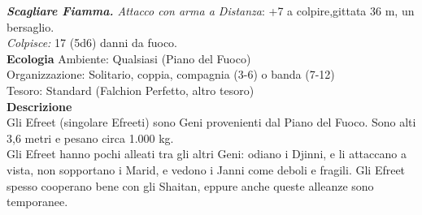\begin{multicols}{2}
\emph{\textbf{Scagliare Fiamma.} Attacco con arma a Distanza}: +7 a colpire,gittata 36 m, un bersaglio.\\
\emph{Colpisce:} 17 (5d6) danni da fuoco.\\
\textbf{Ecologia}
Ambiente: Qualsiasi (Piano del Fuoco)\\
Organizzazione: Solitario, coppia, compagnia (3-6) o banda (7-12)\\
Tesoro: Standard (Falchion Perfetto, altro tesoro)\\
\textbf{Descrizione}\\
Gli Efreet (singolare Efreeti) sono Geni provenienti dal Piano del Fuoco. Sono alti 3,6 metri e pesano circa 1.000 kg.\\
Gli Efreet hanno pochi alleati tra gli altri Geni: odiano i Djinni, e li attaccano a vista, non sopportano i Marid, e vedono i Janni come deboli e fragili. Gli Efreet spesso cooperano bene con gli Shaitan, eppure anche queste alleanze sono temporanee.\\


\end{multicols}
